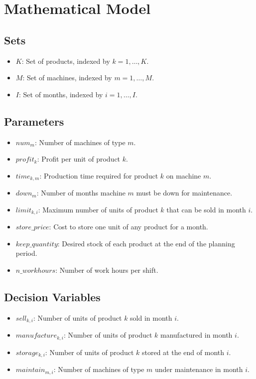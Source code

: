 \documentclass{article}
\begin{document}
\section*{Mathematical Model}

\subsection*{Sets}
\begin{itemize}
    \item $K$: Set of products, indexed by $k = 1, \ldots, K$.
    \item $M$: Set of machines, indexed by $m = 1, \ldots, M$.
    \item $I$: Set of months, indexed by $i = 1, \ldots, I$.
\end{itemize}

\subsection*{Parameters}
\begin{itemize}
    \item $num_{m}$: Number of machines of type $m$.
    \item $profit_k$: Profit per unit of product $k$.
    \item $time_{k,m}$: Production time required for product $k$ on machine $m$.
    \item $down_m$: Number of months machine $m$ must be down for maintenance.
    \item $limit_{k,i}$: Maximum number of units of product $k$ that can be sold in month $i$.
    \item $store\_price$: Cost to store one unit of any product for a month.
    \item $keep\_quantity$: Desired stock of each product at the end of the planning period.
    \item $n\_workhours$: Number of work hours per shift.
\end{itemize}

\subsection*{Decision Variables}
\begin{itemize}
    \item $sell_{k,i}$: Number of units of product $k$ sold in month $i$.
    \item $manufacture_{k,i}$: Number of units of product $k$ manufactured in month $i$.
    \item $storage_{k,i}$: Number of units of product $k$ stored at the end of month $i$.
    \item $maintain_{m,i}$: Number of machines of type $m$ under maintenance in month $i$.
\end{itemize}
\end{document}
